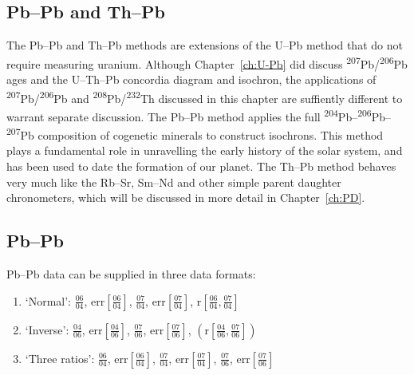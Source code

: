 \begin{refsection}

\chapter{Pb--Pb and Th--Pb}\label{ch:Th-Pb-Pb}

The Pb--Pb and Th--Pb methods are extensions of the U--Pb method that
do not require measuring uranium. Although Chapter~\ref{ch:U-Pb} did
discuss \textsuperscript{207}Pb/\textsuperscript{206}Pb ages and the
U--Th--Pb concordia diagram and isochron, the applications of
\textsuperscript{207}Pb/\textsuperscript{206}Pb and
\textsuperscript{208}Pb/\textsuperscript{232}Th discussed in this
chapter are suffiently different to warrant separate discussion.  The
Pb--Pb method applies the full
\textsuperscript{204}Pb--\textsuperscript{206}Pb--\textsuperscript{207}Pb
composition of cogenetic minerals to construct isochrons. This method
plays a fundamental role in unravelling the early history of the solar
system, and has been used to date the formation of our planet. The
Th--Pb method behaves very much like the Rb--Sr, Sm--Nd and other
simple parent daughter chronometers, which will be discussed in more
detail in Chapter~\ref{ch:PD}.

\section{Pb--Pb}\label{sec:PbPb}

Pb--Pb data can be supplied in three data formats:
\begin{enumerate}
\item{`Normal':}
  $\frac{06}{04}$,  
  $\mbox{err}\!\left[\frac{06}{04}\right]$, 
  $\frac{07}{04}$,  
  $\mbox{err}\!\left[\frac{07}{04}\right]$,  
  $\mbox{r}\!\left[\frac{06}{04},\frac{07}{04}\right]$
\item{`Inverse':}
  $\frac{04}{06}$,  
  $\mbox{err}\!\left[\frac{04}{06}\right]$, 
  $\frac{07}{06}$,  
  $\mbox{err}\!\left[\frac{07}{06}\right]$,  
  $\left(\mbox{r}\!\left[\frac{04}{06},\frac{07}{06}\right]\right)$
\item{`Three ratios':}
  $\frac{06}{04}$, 
  $\mbox{err}\!\left[\frac{06}{04}\right]$, 
  $\frac{07}{04}$, 
  $\mbox{err}\!\left[\frac{07}{04}\right]$, 
  $\frac{07}{06}$, 
  $\mbox{err}\!\left[\frac{07}{06}\right]$
\end{enumerate}


\end{refsection}
